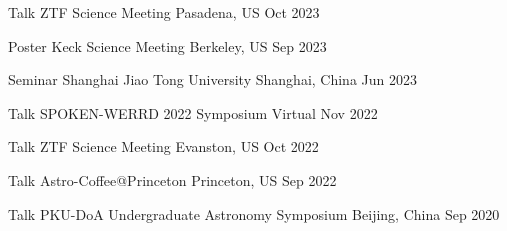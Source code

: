 \begin{cventries}
	\cvsimsimpentry
	{Talk}
	{ZTF Science Meeting}
	{Pasadena, US}
	{Oct 2023}
	
	\cvsimsimpentry
	{Poster}
	{Keck Science Meeting}
	{Berkeley, US}
	{Sep 2023}

	\cvsimsimpentry
	{Seminar}
	{Shanghai Jiao Tong University}
	{Shanghai, China}
	{Jun 2023}

	\cvsimsimpentry
	{Talk}
	{SPOKEN-WERRD 2022 Symposium} %
	{Virtual} %
	{Nov 2022} %

	\cvsimsimpentry
	{Talk} %
	{ZTF Science Meeting} %
	{Evanston, US} %
	{Oct 2022} %

	\cvsimsimpentry
	{Talk} %
	{Astro-Coffee@Princeton} %
	{Princeton, US} %
	{Sep 2022} %
	
	\cvsimsimpentry
	{Talk} %
	{PKU-DoA Undergraduate Astronomy Symposium} %
	{Beijing, China} %
	{Sep 2020} %

\end{cventries}